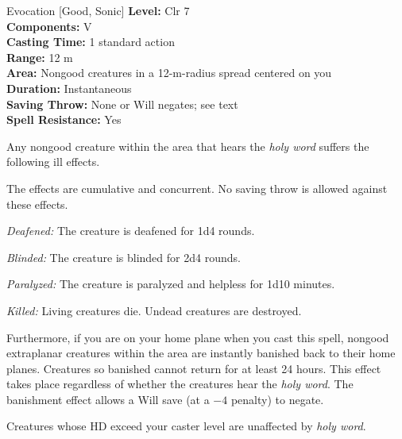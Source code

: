 {Evocation [Good, Sonic]}
{
	\textbf{Level:}
	Clr 7\\
	\textbf{Components:}
	V\\
	\textbf{Casting Time:}
	1 standard action\\
	\textbf{Range:}
	12 m\\
	\textbf{Area:}
	Nongood creatures in a 12-m-radius spread centered on you\\
	\textbf{Duration:}
	Instantaneous\\
	\textbf{Saving Throw:}
	None or Will negates; see text\\
	\textbf{Spell Resistance:}
	Yes\\
}
{
	Any nongood creature within the area that hears the \emph{holy word} suffers the following ill effects.


	The effects are cumulative and concurrent. No saving throw is allowed against these effects.

	\textit{Deafened:}
	The creature is deafened for 1d4 rounds.

	\textit{Blinded:}
	The creature is blinded for 2d4 rounds.

	\textit{Paralyzed:}
	The creature is paralyzed and helpless for 1d10 minutes.

	\textit{Killed:}
	Living creatures die. Undead creatures are destroyed.

	Furthermore, if you are on your home plane when you cast this spell, nongood extraplanar creatures within the area are instantly banished back to their home planes. Creatures so banished cannot return for at least 24 hours. This effect takes place regardless of whether the creatures hear the \emph{holy word}. The banishment effect allows a Will save (at a $-4$ penalty) to negate.

	Creatures whose HD exceed your caster level are unaffected by \emph{holy word}.

}
